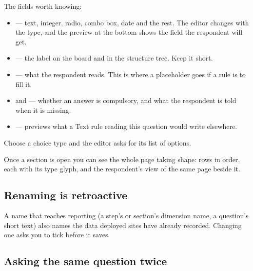 \documentclass[11pt, a4paper]{article}
\begin{document}

The fields worth knowing:

\begin{itemize}
  \item {} — text, integer, radio, combo box, date and the rest. The editor changes with
        the type, and the preview at the bottom shows the field the respondent will get.
  \item {} — the label on the board and in the structure tree. Keep it short.
  \item {} — what the respondent reads. This is where a
         placeholder goes if a rule is to fill it.
  \item {} and  — whether an answer is compulsory, and what
        the respondent is told when it is missing.
  \item {} — previews what a Text rule reading this question would write
        elsewhere.
\end{itemize}

Choose a choice type and the editor asks for its list of options.


Once a section is open you can see the whole page taking shape: rows in order, each with its type
glyph, and the respondent's view of the same page beside it.


\subsection{Renaming is retroactive}

A name that reaches reporting (a step's or section's dimension name, a question's short text)
also names the data deployed sites have already recorded. Changing one asks you to tick  before it saves.

\subsection{Asking the same question twice}
\end{document}
